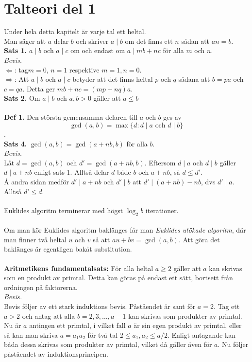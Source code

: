 \chapter{Talteori del 1}

Under hela detta kapitelt är varje tal ett heltal.\\
Man säger att $a$ delar $b$ och skriver $a\mid b$ om det finns ett $n$ sådan att $an=b$.\\
\textbf{Sats 1.} $a\mid b$ och $a \mid c$ om och endast om $a\mid mb+nc$ för alla $m$ och $n$.\\
\textit{Bevis.}\\
$\Leftarrow$: tag$m=0$, $n=1$ respektive $m=1, n=0$.\\
$\Rightarrow$: Att $a\mid b$ och $a\mid c$ betyder att det finns heltal $p$ och $q$ sådana att $b=pa$ och $c=qa$. Detta ger $mb+nc=(mp+nq)a$.\\
\textbf{Sats 2.} Om $a\mid b$ och $a,b>0$ gäller att $a\leq b$\\\\
\textbf{Def 1.} Den största gemensamma delaren till $a$ och $b$ ges av $$\gcd(a,b)=\max\{d: d\mid a \text{ och } d\mid b\}$$.\\
\textbf{Sats 4.} $\gcd(a,b)=\gcd(a+nb,b)$ för alla $b$.\\
\textit{Bevis.}\\
Låt $d=\gcd(a,b)$ och $d'=\gcd(a+nb,b)$. Eftersom $d\mid a$ och $d\mid b$ gäller $d\mid a+nb$ enligt sats 1. Alltså delar $d$ både $b$ och $a+nb$, så $d\leq d'$.\\Å andra sidan medför $d'\mid a+nb$ och $d'\mid b$ att $d'\mid(a+nb)-nb$, dvs $d'\mid a$. Alltså $d'\leq d$.\\\\
Euklides algoritm terminerar med högst $\log_2{b}$ iterationer.\\\\
Om man kör Euklides algoritm baklänges får man \textit{Euklides utökade algoritm}, där man finner två heltal $u$ och $v$ så att $au+bv=\gcd(a,b)$. Att göra det baklänges är egentligen bakåt substitution.\\\\
\textbf{Aritmetikens fundamentalsats:} För alla heltal $a\geq 2$ gäller att $a$ kan skrivas som en produkt av primtal. Detta kan göras på endast ett sätt, bortsett från ordningen på faktorerna.\\
\textit{Bevis.}\\
Bevis följer av ett stark induktions bevis. Påståendet är sant för $a=2$. Tag ett $a>2$ och antag att alla $b=2,3,\ldots,a-1$ kan skrivas som produkter av primtal. Nu är $a$ antingen ett primtal, i vilket fall $a$ är sin egen produkt av primtal, eller så kan man skriva $a=a_1a_2$ för två tal $2\leq a_1,a_2\leq a/2$. Enligt antagande kan båda dessa skrivas som produkter av primtal, vilket då gäller även för $a$. Nu följer påståendet av induktionsprincipen.\\\\
